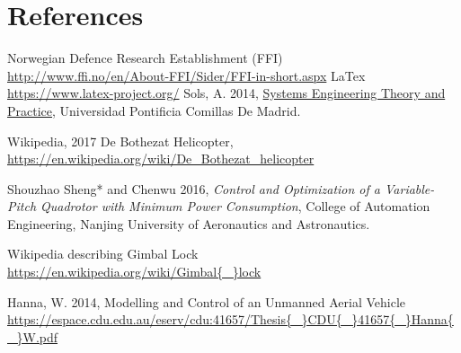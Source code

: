\cleartoleftpage
{
\Hide
\part{References}
}

\begin{thebibliography}{9}


  Norwegian Defence Research Establishment (FFI) \\%
\url{http://www.ffi.no/en/About-FFI/Sider/FFI-in-short.aspx}    %
    LaTex \\                                     %
\url{https://www.latex-project.org/}                            %
Sols, A. 2014,      %
\url{Systems Engineering Theory and Practice},                  %
Universidad Pontificia Comillas De Madrid.                      %







Wikipedia, 2017 De Bothezat Helicopter, \\
\url{https://en.wikipedia.org/wiki/De_Bothezat_helicopter}


Shouzhao Sheng* and Chenwu 2016,      %
\textit{Control and Optimization of a Variable-Pitch
Quadrotor with Minimum Power Consumption},   %
College of Automation Engineering, Nanjing University of Aeronautics and Astronautics.
        
        Wikipedia describing Gimbal Lock \\ 
\url{https://en.wikipedia.org/wiki/Gimbal{\_}lock}

        Hanna, W. 2014, Modelling and Control of an Unmanned Aerial Vehicle \\ 
\url{https://espace.cdu.edu.au/eserv/cdu:41657/Thesis{\_}CDU{\_}41657{\_}Hanna{\_}W.pdf}


\end{thebibliography}
